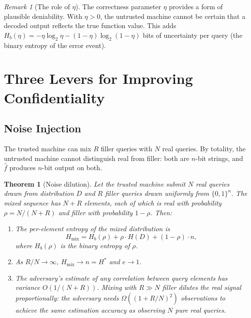 \documentclass[11pt]{article}
\theoremstyle{definition}
\theoremstyle{plain}
\newtheorem{theorem}{Theorem}[section]
\theoremstyle{remark}
\newtheorem{remark}{Remark}[section]
\newcommand{\fhat}{\hat{f}}
\newcommand{\B}{\{0,1\}}
\begin{document}
\begin{remark}[The role of $\eta$]
The correctness parameter $\eta$ provides a form of plausible
deniability.  With $\eta > 0$, the untrusted machine cannot be certain
that a decoded output reflects the true function value.  This adds
$H_b(\eta) = -\eta \log_2 \eta - (1-\eta) \log_2(1-\eta)$ bits of
uncertainty per query (the binary entropy of the error event).
\end{remark}


\section{Three Levers for Improving Confidentiality}
\label{sec:levers}

\subsection{Noise Injection}
\label{subsec:noise}

The trusted machine can mix $R$ filler queries with $N$ real queries.  By
totality, the untrusted machine cannot distinguish real from filler: both
are $n$-bit strings, and $\fhat$ produces $n$-bit output on both.

\begin{theorem}[Noise dilution]
\label{thm:noise-dilution}
Let the trusted machine submit $N$ real queries drawn from distribution
$D$ and $R$ filler queries drawn uniformly from $\B^n$.  The mixed
sequence has $N + R$ elements, each of which is real with probability
$\rho = N / (N + R)$ and filler with probability $1 - \rho$.  Then:
\begin{enumerate}
\item The per-element entropy of the mixed distribution is
\begin{equation}
\label{eq:noise-entropy}
H_{\mathrm{mix}} = H_b(\rho) + \rho \cdot H(D) + (1 - \rho) \cdot n,
\end{equation}
where $H_b(\rho)$ is the binary entropy of $\rho$.

\item As $R/N \to \infty$, $H_{\mathrm{mix}} \to n = H^*$ and $e \to 1$.

\item The adversary's estimate of any correlation between query elements
  has variance $O(1/(N+R))$.  Mixing with $R \gg N$ filler dilutes the
  real signal proportionally: the adversary needs
  $\Omega((1 + R/N)^2)$ observations to achieve the same estimation
  accuracy as observing $N$ pure real queries.
\end{enumerate}
\end{theorem}
\end{document}
